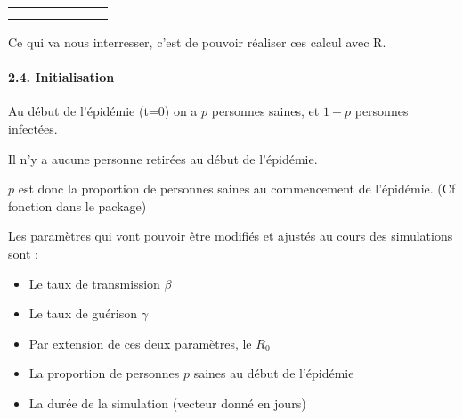 \documentclass[
]{article}
\providecommand{\tightlist}{%
  \setlength{\itemsep}{0pt}\setlength{\parskip}{0pt}}
\begin{document}
\begin{longtable}[]{@{}ccccccc@{}}
\begin{minipage}[t]{0.11\columnwidth}
\strut
\end{minipage}\tabularnewline
\begin{minipage}[t]{0.05\columnwidth}\centering
3\strut
\end{minipage} & \begin{minipage}[t]{0.11\columnwidth}\centering
\strut
\end{minipage} & \begin{minipage}[t]{0.11\columnwidth}\centering
\strut
\end{minipage} & \begin{minipage}[t]{0.11\columnwidth}\centering
\strut
\end{minipage} & \begin{minipage}[t]{0.16\columnwidth}\centering
\strut
\end{minipage} & \begin{minipage}[t]{0.16\columnwidth}\centering
\strut
\end{minipage} & \begin{minipage}[t]{0.11\columnwidth}\centering
\strut
\end{minipage}\tabularnewline
\bottomrule
\end{longtable}

Ce qui va nous interresser, c'est de pouvoir réaliser ces calcul avec R.

\hypertarget{initialisation}{%
\paragraph{2.4. Initialisation}\label{initialisation}}

Au début de l'épidémie (t=0) on a \(p\) personnes saines, et \(1-p\)
personnes infectées.

Il n'y a aucune personne retirées au début de l'épidémie.

\emph{\(p\)} est donc la proportion de personnes saines au commencement
de l'épidémie. (Cf fonction dans le package)

Les paramètres qui vont pouvoir être modifiés et ajustés au cours des
simulations sont :

\begin{itemize}
\tightlist
\item
  Le taux de transmission \(\beta\)
\item
  Le taux de guérison \(\gamma\)
\item
  Par extension de ces deux paramètres, le \(R_0\)
\item
  La proportion de personnes \(p\) saines au début de l'épidémie
\item
  La durée de la simulation (vecteur donné en jours)
\end{itemize}
\end{document}
